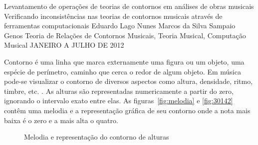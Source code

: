 \documentclass[11pt]{article}
\begin{document}
\graphicspath{{figs/}}


\dadosRelatorioFinal
{Levantamento de operações de teorias de contornos em análises de
  obras musicais}
{Verificando inconsistências nas teorias de contornos musicais através
  de ferramentas computacionais}
{Eduardo Lago Nunes}
{Marcos da Silva Sampaio}
{Genos}
{Teoria de Relações de Contornos Musicais, Teoria Musical, Computação Musical}
{JANEIRO A JULHO DE 2012}


\newpage

\setcounter{page}{1}
\onehalfspace

\label{sec:introducao}

Contorno é uma linha que marca externamente uma figura ou um objeto,
uma espécie de perímetro, caminho que cerca o redor de
algum objeto. Em música pode-se visualizar o contorno de
diversos aspectos como altura, densidade, ritmo, timbre, etc.
\cite[p. 01]{Sampaio2008}. As alturas são representadas numericamente
a partir do zero, ignorando o intervalo exato entre elas. As
figuras~\ref{fig:melodia} e \ref{fig:30142} contêm uma melodia e a
representação gráfica de seu contorno onde a nota mais baixa é o zero
e a mais alta o quatro.

\begin{figure}[h]
  \centering
  \caption{Melodia e representação do contorno de alturas}
  \label{fig:melodia-representacao}
\end{figure}
\end{document}
